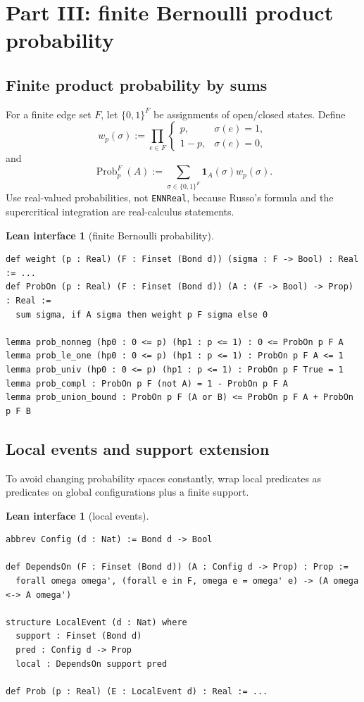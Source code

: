 \documentclass[11pt]{article}
\newcommand{\one}{\mathbf 1}
\newcommand{\prob}{\operatorname{Prob}}
\theoremstyle{definition}
\newtheorem{interface}[definition]{Lean interface}
\theoremstyle{plain}
\begin{document}
\section{Part III: finite Bernoulli product probability}

\subsection{Finite product probability by sums}

For a finite edge set $F$, let $\{0,1\}^F$ be assignments of open/closed states.  Define
\[
  w_p(\sigma):=\prod_{e\in F}
       \begin{cases}
       p,&\sigma(e)=1,\\
       1-p,&\sigma(e)=0,
       \end{cases}
\]
and
\[
  \prob_p^F(A):=\sum_{\sigma\in\{0,1\}^F}\one_A(\sigma)w_p(\sigma).
\]
Use real-valued probabilities, not \texttt{ENNReal}, because Russo's formula and the supercritical integration are real-calculus statements.

\begin{interface}[finite Bernoulli probability]
\begin{lstlisting}
def weight (p : Real) (F : Finset (Bond d)) (sigma : F -> Bool) : Real := ...
def ProbOn (p : Real) (F : Finset (Bond d)) (A : (F -> Bool) -> Prop) : Real :=
  sum sigma, if A sigma then weight p F sigma else 0

lemma prob_nonneg (hp0 : 0 <= p) (hp1 : p <= 1) : 0 <= ProbOn p F A
lemma prob_le_one (hp0 : 0 <= p) (hp1 : p <= 1) : ProbOn p F A <= 1
lemma prob_univ (hp0 : 0 <= p) (hp1 : p <= 1) : ProbOn p F True = 1
lemma prob_compl : ProbOn p F (not A) = 1 - ProbOn p F A
lemma prob_union_bound : ProbOn p F (A or B) <= ProbOn p F A + ProbOn p F B
\end{lstlisting}
\end{interface}

\subsection{Local events and support extension}

To avoid changing probability spaces constantly, wrap local predicates as predicates on global configurations plus a finite support.

\begin{interface}[local events]
\begin{lstlisting}
abbrev Config (d : Nat) := Bond d -> Bool

def DependsOn (F : Finset (Bond d)) (A : Config d -> Prop) : Prop :=
  forall omega omega', (forall e in F, omega e = omega' e) -> (A omega <-> A omega')

structure LocalEvent (d : Nat) where
  support : Finset (Bond d)
  pred : Config d -> Prop
  local : DependsOn support pred

def Prob (p : Real) (E : LocalEvent d) : Real := ...
\end{lstlisting}
\end{interface}
\end{document}
